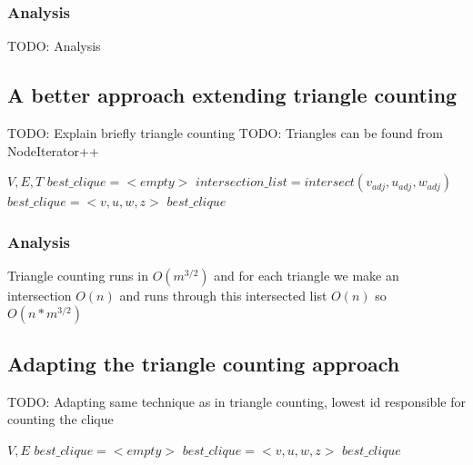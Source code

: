 \documentclass{article}
\begin{document}
\subsubsection{Analysis}
TODO: Analysis

\subsection{A better approach extending triangle counting}
TODO: Explain briefly triangle counting
TODO: Triangles can be found from NodeIterator++

\begin{algorithm}
\caption{$4clique\_iterator+$}
\begin{algorithmic}
\REQUIRE $V,E,T$
\STATE $best\_clique = <empty>$
\STATE $intersection\_list = intersect(v_{adj}, u_{adj}, w_{adj})$
\STATE $best\_clique = <v,u,w,z>$
\ENDIF
\ENDFOR
\ENDIF
\ENDFOR
\RETURN $best\_clique$
\end{algorithmic}
\end{algorithm}

\subsubsection{Analysis}
Triangle counting runs in $O(m^{3/2})$ and for each triangle we make an intersection $O(n)$ and runs through this intersected list $O(n)$ so $O(n*m^{3/2})$

\subsection{Adapting the triangle counting approach}
TODO: Adapting same technique as in triangle counting, lowest id responsible for counting the clique

\begin{algorithm}
\caption{$4clique\_iterator$}
\begin{algorithmic}
\REQUIRE $V,E$
\STATE $best\_clique = <empty>$
\STATE $best\_clique = <v,u,w,z>$
\ENDIF
\ENDIF
\ENDFOR
\ENDIF
\ENDFOR
\ENDIF
\ENDFOR
\ENDFOR
\RETURN $best\_clique$
\end{algorithmic}
\end{algorithm}
\end{document}
